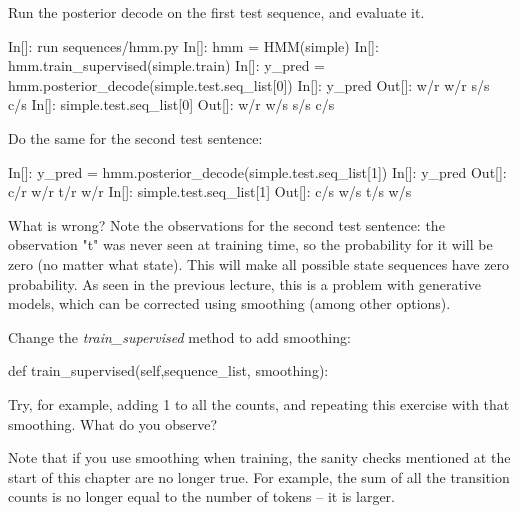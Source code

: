\begin{exercise}

Run the posterior decode on the first test sequence, and evaluate it.
 
\begin{python}
In[]: run sequences/hmm.py
In[]: hmm = HMM(simple)
In[]: hmm.train_supervised(simple.train)
In[]: y_pred = hmm.posterior_decode(simple.test.seq_list[0])
In[]: y_pred
Out[]: w/r w/r s/s c/s
In[]: simple.test.seq_list[0]
Out[]: w/r w/s s/s c/s
\end{python}

Do the same for the second test sentence:
\begin{python}
In[]: y_pred = hmm.posterior_decode(simple.test.seq_list[1])
In[]: y_pred
Out[]: c/r w/r t/r w/r
In[]: simple.test.seq_list[1]
Out[]: c/s w/s t/s w/s 
\end{python}

What is wrong? Note the observations for the second test sentence: the
observation "t" was never seen at training time, so the probability for
it will be zero (no matter what state). This will make all possible state
sequences have zero probability.
As seen in the previous lecture, this is a problem with generative
models, which can be corrected using smoothing (among other
options).

Change the \emph{train\_supervised} method to add smoothing:
\begin{python}
def train_supervised(self,sequence_list, smoothing):
\end{python}

Try, for example, adding 1 to all the counts, and repeating this exercise with that smoothing. What do you observe?
\end{exercise}

Note that if you use smoothing when training, the sanity checks mentioned at the start of this chapter are no longer true. For example, the sum of all the transition counts is no longer equal to the number of tokens -- it is larger.

%


